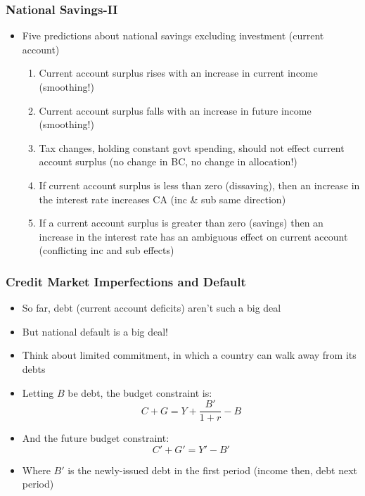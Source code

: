 \documentclass{beamer}
\begin{document}
\begin{frame}
\frametitle[alignment=center]{National Savings-II}
\begin{itemize}
\item Five predictions about national savings excluding investment (current account)
\bigskip
\begin{enumerate}
\item Current account surplus rises with an increase in current income (smoothing!)
\smallskip
\item Current account surplus falls with an increase in future income (smoothing!)
\smallskip
\item Tax changes, holding constant govt spending, should not effect current account surplus (no change in BC, no change in allocation!)
\smallskip
\item If current account surplus is less than zero (dissaving), then an increase in the interest rate increases CA (inc \& sub same direction)
\smallskip
\item If a current account surplus is greater than zero (savings) then an increase in the interest rate has an ambiguous effect on current account (conflicting inc and sub effects)
\end{enumerate}
\end{itemize}
\end{frame}




\begin{frame}
\frametitle[alignment=center]{Credit Market Imperfections and Default}
\begin{itemize}
\item So far, debt (current account deficits) aren't such a big deal
\bigskip
\item But national default is a big deal!
\bigskip
\item Think about limited commitment, in which a country can walk away from its debts
\bigskip
\item Letting $B$ be debt, the budget constraint is:
$$C+G=Y+\frac{B'}{1+r}-B$$
\item And the future budget constraint:
$$C'+G'=Y'-B'$$
\item Where $B'$ is the newly-issued debt in the first period (income then, debt next period)
\end{itemize}
\end{frame}
\end{document}
